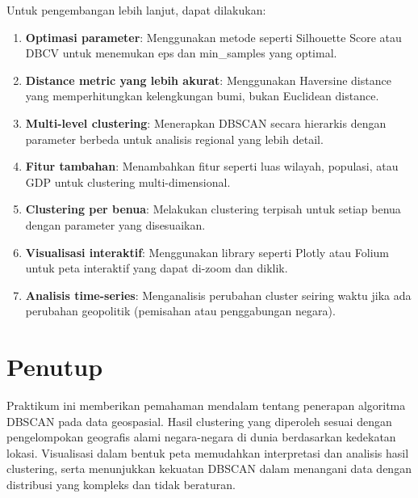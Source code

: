 \documentclass[12pt,a4paper]{article}
\begin{document}
Untuk pengembangan lebih lanjut, dapat dilakukan:

\begin{enumerate}
    \item \textbf{Optimasi parameter}: Menggunakan metode seperti Silhouette Score atau DBCV untuk menemukan eps dan min\_samples yang optimal.
    
    \item \textbf{Distance metric yang lebih akurat}: Menggunakan Haversine distance yang memperhitungkan kelengkungan bumi, bukan Euclidean distance.
    
    \item \textbf{Multi-level clustering}: Menerapkan DBSCAN secara hierarkis dengan parameter berbeda untuk analisis regional yang lebih detail.
    
    \item \textbf{Fitur tambahan}: Menambahkan fitur seperti luas wilayah, populasi, atau GDP untuk clustering multi-dimensional.
    
    \item \textbf{Clustering per benua}: Melakukan clustering terpisah untuk setiap benua dengan parameter yang disesuaikan.
    
    \item \textbf{Visualisasi interaktif}: Menggunakan library seperti Plotly atau Folium untuk peta interaktif yang dapat di-zoom dan diklik.
    
    \item \textbf{Analisis time-series}: Menganalisis perubahan cluster seiring waktu jika ada perubahan geopolitik (pemisahan atau penggabungan negara).
\end{enumerate}

\section*{Penutup}

Praktikum ini memberikan pemahaman mendalam tentang penerapan algoritma DBSCAN pada data geospasial. Hasil clustering yang diperoleh sesuai dengan pengelompokan geografis alami negara-negara di dunia berdasarkan kedekatan lokasi. Visualisasi dalam bentuk peta memudahkan interpretasi dan analisis hasil clustering, serta menunjukkan kekuatan DBSCAN dalam menangani data dengan distribusi yang kompleks dan tidak beraturan.
\end{document}
